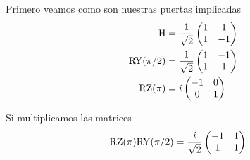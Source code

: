 Primero veamos como son nuestras puertas implicadas
\begin{equation*}
	\begin{split}
	\text{H}&=\frac{1}{\sqrt{2}}\begin{pmatrix}1 & 1 \\ 1 & -1\end{pmatrix}\\
	\text{RY}(\pi/2)&=\frac{1}{\sqrt{2}}\begin{pmatrix}1 & -1\\1 & 1\end{pmatrix}\\
	\text{RZ}(\pi)&=i\begin{pmatrix}-1 & 0\\0 & 1\end{pmatrix}
	\end{split}
\end{equation*}

Si multiplicamos las matrices
\begin{equation*}
	\begin{split}
		\text{RZ}(\pi)\text{RY}(\pi/2)&=\frac{i}{\sqrt{2}}\begin{pmatrix}-1 & 1\\1 & 1\end{pmatrix}
	\end{split}
\end{equation*}


